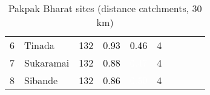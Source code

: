 \begin{table}[ht]
\begin{tabular}{C{0.05\textwidth}C{0.15\textwidth}C{0.08\textwidth}C{0.08\textwidth}C{0.08\textwidth}C{0.08\textwidth}C{0.08\textwidth}C{0.08\textwidth}C{0.08\textwidth}C{0.08\textwidth}}
  {6} & Tinada & 132 & \textcolor[HTML]{000000}{0.93} & \textcolor[HTML]{000000}{0.46} & \textcolor[HTML]{000000}{4} &  &  &  &  \\ 
  {7} & Sukaramai & 132 & \textcolor[HTML]{000000}{0.88} & \textcolor[HTML]{FFFFFF}{0.47} & \textcolor[HTML]{000000}{4} &  &  &  &  \\ 
  {8} & Sibande & 132 & \textcolor[HTML]{000000}{0.86} & \textcolor[HTML]{FFFFFF}{0.50} & \textcolor[HTML]{000000}{4} &  &  &  &  \\ 
  \end{tabular}
\endgroup
\caption{Pakpak Bharat sites (distance catchments, 30 km)} 
\label{tab:pakpak_bharat_dist}
\end{table}
